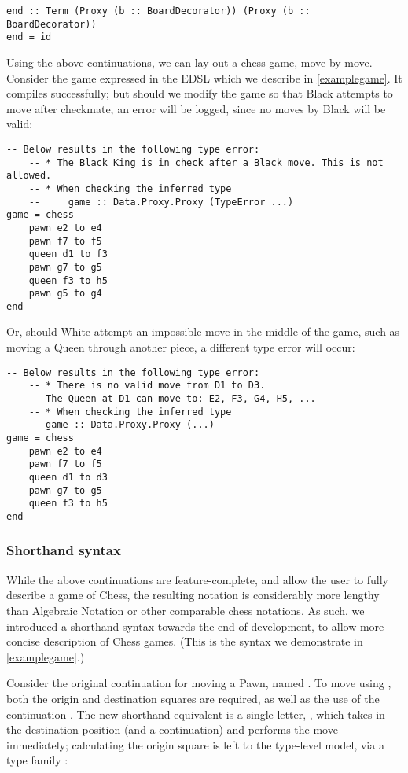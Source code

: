 \begin{lstlisting}
end :: Term (Proxy (b :: BoardDecorator)) (Proxy (b :: BoardDecorator))
end = id
\end{lstlisting}

Using the above continuations, we can lay out a chess game, move by move. Consider the game expressed in the EDSL which we describe in \cref{examplegame}. It compiles successfully; but should we modify the game so that Black attempts to move after checkmate, an error will be logged, since no moves by Black will be valid:

\begin{lstlisting}
-- Below results in the following type error:
    -- * The Black King is in check after a Black move. This is not allowed.
    -- * When checking the inferred type
    --     game :: Data.Proxy.Proxy (TypeError ...)
game = chess
    pawn e2 to e4
    pawn f7 to f5
    queen d1 to f3
    pawn g7 to g5
    queen f3 to h5
    pawn g5 to g4
end
\end{lstlisting}

Or, should White attempt an impossible move in the middle of the game, such as moving a Queen through another piece, a different type error will occur:

\begin{lstlisting}
-- Below results in the following type error:
    -- * There is no valid move from D1 to D3.
    -- The Queen at D1 can move to: E2, F3, G4, H5, ...
    -- * When checking the inferred type
    -- game :: Data.Proxy.Proxy (...)
game = chess
    pawn e2 to e4
    pawn f7 to f5
    queen d1 to d3
    pawn g7 to g5
    queen f3 to h5
end
\end{lstlisting}

\subsubsection{Shorthand syntax} \label{shorthandexplanation}

While the above continuations are feature-complete, and allow the user to fully describe a game of Chess, the resulting notation is considerably more lengthy than Algebraic Notation or other comparable chess notations. As such, we introduced a shorthand syntax towards the end of development, to allow more concise description of Chess games. (This is the syntax we demonstrate in \cref{examplegame}.)

Consider the original continuation for moving a Pawn, named . To move using , both the origin and destination squares are required, as well as the use of the continuation . The new shorthand equivalent is a single letter, , which takes in the destination position (and a continuation) and performs the move immediately; calculating the origin square is left to the type-level model, via a type family :

